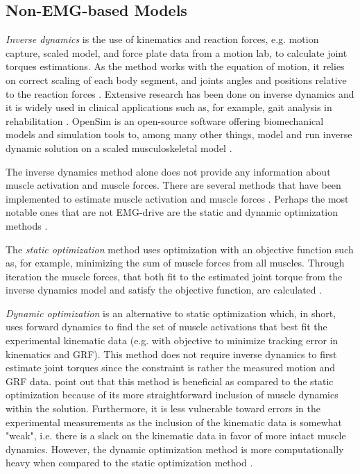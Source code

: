 \subsection{Non-\ac{EMG}-based Models}
\label{sec:A-NonEMGBasedModels}
\textit{Inverse dynamics} is the use of kinematics and reaction forces, e.g. motion capture, scaled model, and force plate data from a motion lab, to calculate joint torques estimations.
As the method works with the equation of motion, it relies on correct scaling of each body segment, and joints angles and positions relative to the reaction forces \cite{Buchanan2004,Erdemir2007}.
Extensive research has been done on inverse dynamics and it is widely used in clinical applications such as, for example, gait analysis in rehabilitation \cite{Erdemir2007,Buchanan2004,Pizzolato2015}.
OpenSim \cite{Delp2007, Seth2018} is an open-source software offering biomechanical models and simulation tools to, among many other things, model and run inverse dynamic solution on a scaled musculoskeletal model \cite{Buchanan2004, Delp2007, Seth2018, Pizzolato2017}.

The inverse dynamics method alone does not provide any information about muscle activation and muscle forces.
There are several methods that have been implemented to estimate muscle activation and muscle forces \cite{Erdemir2007}.
Perhaps the most notable ones that are not \ac{EMG}-drive are the static and dynamic optimization methods \cite{Erdemir2007, Delp2007, Pizzolato2015}. 

The \textit{static optimization} method uses optimization with an objective function such as, for example, minimizing the sum of muscle forces from all muscles. 
Through iteration the muscle forces, that both fit to the estimated joint torque from the inverse dynamics model and satisfy the objective function, are calculated \cite{Erdemir2007}. 

\textit{Dynamic optimization} is an alternative to static optimization which, in short, uses forward dynamics to find the set of muscle activations that best fit the experimental kinematic data (e.g. with objective to minimize tracking error in kinematics and \ac{GRF}). 
This method does not require inverse dynamics to first estimate joint torques since the constraint is rather the measured motion and \ac{GRF} data.
\textcite{Erdemir2007} point out that this method is beneficial as compared to the static optimization because of its more straightforward inclusion of muscle dynamics within the solution.
Furthermore, it is less vulnerable toward errors in the experimental measurements as the inclusion of the kinematic data is somewhat "weak", i.e. there is a slack on the kinematic data in favor of more intact muscle dynamics.
However, the dynamic optimization method is more computationally heavy when compared to the static optimization method \cite{Erdemir2007}.

